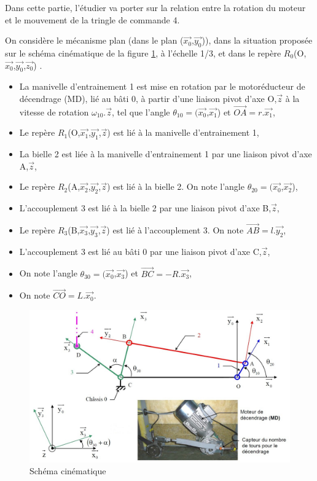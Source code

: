 Dans cette partie, l'étudier va porter sur la relation entre la rotation du moteur et le mouvement de la tringle de commande 4.

On considère le mécanisme plan (dans le plan ($\overrightarrow{x_0}$,$\overrightarrow{y_0}$)), dans la situation proposée sur le schéma cinématique de la figure \ref{fig:image11}, à l'échelle 1/3, et dans le repère $R_0$(O,$\overrightarrow{x_0}$,$\overrightarrow{y_0}$,$\overrightarrow{z_0}$) .

\begin{itemize}
	\item La manivelle d'entrainement 1 est mise en rotation par le motoréducteur de décendrage (MD), lié au bâti 0, à partir d'une liaison pivot d'axe O,$\overrightarrow{z}$ à la vitesse de rotation $\omega_{10}.\overrightarrow{z}$, tel que l'angle $\theta_{10}=(\overrightarrow{x_0}$,$\overrightarrow{x_1}$) et $\overrightarrow{OA}=r.\overrightarrow{x_1}$,
	\item Le repère $R_1$(O,$\overrightarrow{x_1}$,$\overrightarrow{y_1}$,$\overrightarrow{z}$) est lié à la manivelle d'entrainement 1,
	\item La bielle 2 est liée à la manivelle d'entrainement 1 par une liaison pivot d'axe A,$\overrightarrow{z}$,
	\item Le repère $R_2$(A,$\overrightarrow{x_2}$,$\overrightarrow{y_2}$,$\overrightarrow{z}$) est lié à la bielle 2. On note l'angle $\theta_{20}=(\overrightarrow{x_0}$,$\overrightarrow{x_2}$),
	\item L'accouplement 3 est lié à la bielle 2 par une liaison pivot d'axe B,$\overrightarrow{z}$,
	\item Le repère $R_3$(B,$\overrightarrow{x_3}$,$\overrightarrow{y_3}$,$\overrightarrow{z}$) est lié à l'accouplement 3. On note $\overrightarrow{AB}=l.\overrightarrow{y_2}$,
	\item L'accouplement 3 est lié au bâti 0 par une liaison pivot d'axe C,$\overrightarrow{z}$,
	\item On note l'angle $\theta_{30}=(\overrightarrow{x_0}$,$\overrightarrow{x_3}$) et $\overrightarrow{BC}=-R.\overrightarrow{x_3}$,
	\item On note $\overrightarrow{CO}=L.\overrightarrow{x_0}$.
\end{itemize}

\begin{figure}[htbp]
\begin{center}
\includegraphics[width=0.7\linewidth]{img/Chaudiere_cin.jpg}
\caption{Schéma cinématique}
\label{fig:image11}
\end{center}
\end{figure}


